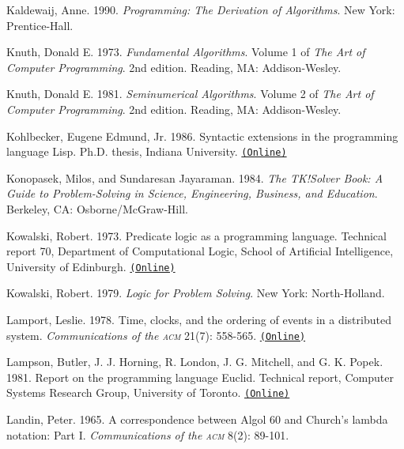 \documentclass[oneside]{book}
\newcommand{\acronym}[1]{\textsc{\MakeLowercase{#1}}}
\newcommand{\code}[1]{\texttt{#1}}
\begin{document}
 \label{Kaldewaij 1990}
Kaldewaij, Anne. 1990.  \textit{Programming: The Derivation of Algorithms}. New
York: Prentice-Hall.

 \label{Knuth (1973)}
Knuth, Donald E.  1973.  \textit{Fundamental Algorithms}. Volume 1 of \textit{The
Art of Computer Programming}.  2nd edition. Reading, MA: Addison-Wesley.

 \label{Knuth 1981}
Knuth, Donald E.  1981.  \textit{Seminumerical Algorithms}. Volume 2 of \textit{The
Art of Computer Programming}.  2nd edition. Reading, MA: Addison-Wesley.

 \label{Kohlbecker 1986}
Kohlbecker, Eugene Edmund, Jr. 1986.  Syntactic extensions in the programming
language Lisp.  Ph.D. thesis, Indiana University.
\href{http://www.ccs.neu.edu/scheme/pubs/dissertation-kohlbecker.pdf}{\code{(Online)}}

 \label{Konopasek and Jayaraman 1984}
Konopasek, Milos, and Sundaresan Jayaraman.  1984.  \textit{The TK!Solver Book: A
Guide to Problem-Solving in Science, Engineering, Business, and
Education}. Berkeley, CA: Osborne/McGraw-Hill.

 \label{Kowalski (1973; 1979)}
Kowalski, Robert.  1973.  Predicate logic as a programming language.  Technical
report 70, Department of Computational Logic, School of Artificial
Intelligence, University of Edinburgh.
\href{http://www.doc.ic.ac.uk/~rak/papers/IFIP\%2074.pdf}{\code{(Online)}}

Kowalski, Robert.  1979.  \textit{Logic for Problem Solving}. New York:
North-Holland.

 \label{Lamport (1978)}
Lamport, Leslie. 1978.  Time, clocks, and the ordering of events in a
distributed system.  \textit{Communications of the \acronym{ACM}} 21(7): 558-565.
\href{http://www.stanford.edu/class/cs240/readings/lamport.pdf}{\code{(Online)}}

 \label{Lampson et al. 1981}
Lampson, Butler, J. J. Horning, R.  London, J. G. Mitchell, and G. K.  Popek.
1981.  Report on the programming language Euclid.  Technical report, Computer
Systems Research Group, University of Toronto.
\href{http://www.bitsavers.org/pdf/xerox/parc/techReports/CSL-81-12_Report_On_The_Programming_Language_Euclid.pdf}{\code{(Online)}}

 \label{Landin (1965)}
Landin, Peter.  1965.  A correspondence between Algol 60 and Church's lambda
notation: Part I.  \textit{Communications of the \acronym{ACM}} 8(2): 89-101.
\end{document}
